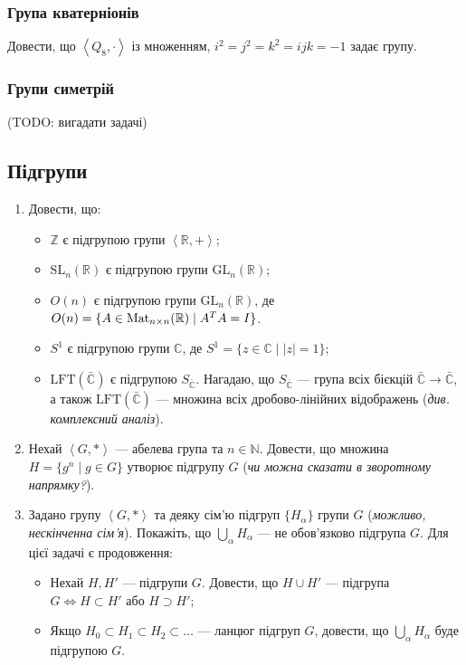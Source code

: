 \documentclass{math_library}
\begin{document}
\subsubsection{Група кватерніонів}
Довести, що $\left< Q_8, \cdot\right>$ із множенням, $i^2 = j^2 = k^2 = ijk = -1$ задає групу.

\subsubsection{Групи симетрій}
(TODO: вигадати задачі)

\subsection{Підгрупи}
\begin{enumerate}[wide=0pt,label=\thesubsection.\arabic*]
\item Довести, що:
\begin{itemize}[nosep]
\item $\mathbb{Z}$ є підгрупою групи $\left<\mathbb{R},+\right>$;
\item $\mathrm{SL}_n(\mathbb{R})$ є підгрупою групи $\mathrm{GL}_n(\mathbb{R})$;
\item $O(n)$ є підгрупою групи $\mathrm{GL}_n(\mathbb{R})$, де $O(n) = \{A \in \operatorname{Mat}_{n \times n}(\mathbb{R}) \mid A^T A = I \}$.
\item $S^1$ є підгрупою групи $\mathbb{C}$, де $S^1 = \{z \in \mathbb{C} \mid |z| = 1\}$;
\item $\text{LFT}(\bar{\mathbb{C}})$ є підгрупою $S_{\bar{\mathbb{C}}}$. Нагадаю, що $S_{\bar{\mathbb{C}}}$ --- група всіх бієкцій $\bar{\mathbb{C}} \to \bar{\mathbb{C}}$, а також $\text{LFT}(\bar{\mathbb{C}})$ --- множина всіх дробово-лінійних відображень (\textit{див. комплексний аналіз}).
\end{itemize}

\item Нехай $\left<G,*\right>$ --- абелева група та $n \in \mathbb{N}$. Довести, що множина $H = \{ g^n \mid g \in G\}$ утворює підгрупу $G$ (\textit{чи можна сказати в зворотному напрямку?}).

\item Задано групу $\left< G,*\right>$ та деяку сім'ю підгруп $\{H_\alpha\}$ групи $G$ (\textit{можливо, нескінченна сім'я}). Покажіть, що $\displaystyle\bigcup_{\alpha} H_\alpha$ --- не обов'язково підгрупа $G$. Для цієї задачі є продовження:
\begin{itemize}[nosep,wide=0pt]
\item Нехай $H,H'$ --- підгрупи $G$. Довести, що $H \cup H'$ --- підгрупа $G \iff H \subset H'$ або $H \supset H'$;
\item Якщо $H_0 \subset H_1 \subset H_2 \subset \dots$ --- ланцюг підгруп $G$, довести, що $\displaystyle\bigcup_{\alpha} H_\alpha$ буде підгрупою $G$.
\end{itemize}
\end{enumerate}
\end{document}
